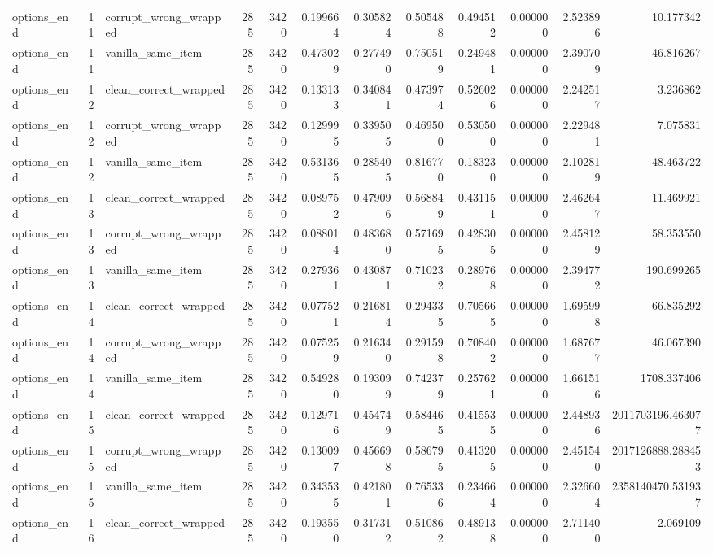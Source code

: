 \begin{tabular}{lrlrrrrrrrrr}
options\_end & 11 & corrupt\_wrong\_wrapped & 285 & 3420 & 0.199664 & 0.305824 & 0.505488 & 0.494512 & 0.000000 & 2.523896 & 10.177342 \\
options\_end & 11 & vanilla\_same\_item & 285 & 3420 & 0.473029 & 0.277490 & 0.750519 & 0.249481 & 0.000000 & 2.390709 & 46.816267 \\
options\_end & 12 & clean\_correct\_wrapped & 285 & 3420 & 0.133133 & 0.340841 & 0.473974 & 0.526026 & 0.000000 & 2.242517 & 3.236862 \\
options\_end & 12 & corrupt\_wrong\_wrapped & 285 & 3420 & 0.129995 & 0.339505 & 0.469500 & 0.530500 & 0.000000 & 2.229481 & 7.075831 \\
options\_end & 12 & vanilla\_same\_item & 285 & 3420 & 0.531365 & 0.285405 & 0.816770 & 0.183230 & 0.000000 & 2.102819 & 48.463722 \\
options\_end & 13 & clean\_correct\_wrapped & 285 & 3420 & 0.089752 & 0.479096 & 0.568849 & 0.431151 & 0.000000 & 2.462647 & 11.469921 \\
options\_end & 13 & corrupt\_wrong\_wrapped & 285 & 3420 & 0.088014 & 0.483680 & 0.571695 & 0.428305 & 0.000000 & 2.458129 & 58.353550 \\
options\_end & 13 & vanilla\_same\_item & 285 & 3420 & 0.279361 & 0.430871 & 0.710232 & 0.289768 & 0.000000 & 2.394772 & 190.699265 \\
options\_end & 14 & clean\_correct\_wrapped & 285 & 3420 & 0.077521 & 0.216814 & 0.294335 & 0.705665 & 0.000000 & 1.695998 & 66.835292 \\
options\_end & 14 & corrupt\_wrong\_wrapped & 285 & 3420 & 0.075259 & 0.216340 & 0.291598 & 0.708402 & 0.000000 & 1.687677 & 46.067390 \\
options\_end & 14 & vanilla\_same\_item & 285 & 3420 & 0.549280 & 0.193099 & 0.742379 & 0.257621 & 0.000000 & 1.661516 & 1708.337406 \\
options\_end & 15 & clean\_correct\_wrapped & 285 & 3420 & 0.129716 & 0.454749 & 0.584465 & 0.415535 & 0.000000 & 2.448936 & 2011703196.463077 \\
options\_end & 15 & corrupt\_wrong\_wrapped & 285 & 3420 & 0.130097 & 0.456698 & 0.586795 & 0.413205 & 0.000000 & 2.451540 & 2017126888.288453 \\
options\_end & 15 & vanilla\_same\_item & 285 & 3420 & 0.343535 & 0.421801 & 0.765336 & 0.234664 & 0.000000 & 2.326604 & 2358140470.531937 \\
options\_end & 16 & clean\_correct\_wrapped & 285 & 3420 & 0.193550 & 0.317312 & 0.510862 & 0.489138 & 0.000000 & 2.711400 & 2.069109 \\

\end{tabular}
